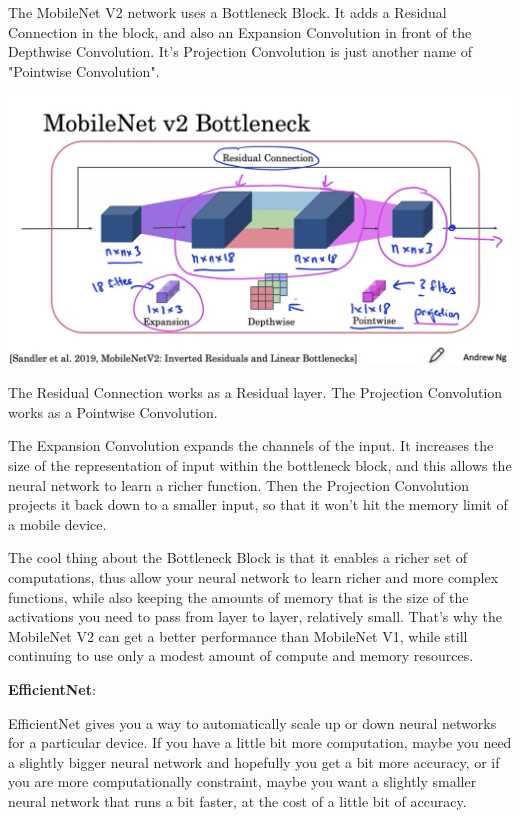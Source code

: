 \documentclass{article}
\begin{document}
\noindent The MobileNet V2 network uses a Bottleneck Block. It adds a Residual Connection in the block, and also an Expansion Convolution in front of the Depthwise Convolution. It's Projection Convolution is just another name of "Pointwise Convolution".

\begin{center}
\includegraphics[scale=0.3]{./images/mobilenet_v2_architecture.png}
\end{center}

\noindent The Residual Connection works as a Residual layer. The Projection Convolution works as a Pointwise Convolution.

\bigskip

\noindent The Expansion Convolution expands the channels of the input. It increases the size of the representation of input within the bottleneck block, and this allows the neural network to learn a richer function. Then the Projection Convolution projects it back down to a smaller input, so that it won't hit the memory limit of a mobile device.

\bigskip

\noindent The cool thing about the Bottleneck Block is that it enables a richer set of computations, thus allow your neural network to learn richer and more complex functions, while also keeping the amounts of memory that is the size of the activations you need to pass from layer to layer, relatively small. That's why the MobileNet V2 can get a better performance than MobileNet V1, while still continuing to use only a modest amount of compute and memory resources.

\bigskip

\noindent \textbf{EfficientNet}:

\noindent EfficientNet gives you a way to automatically scale up or down neural networks for a particular device. If you have a little bit more computation, maybe you need a slightly bigger neural network and hopefully you get a bit more accuracy, or if you are more computationally constraint, maybe you want a slightly smaller neural network that runs a bit faster, at the cost of a little bit of accuracy.
\end{document}
